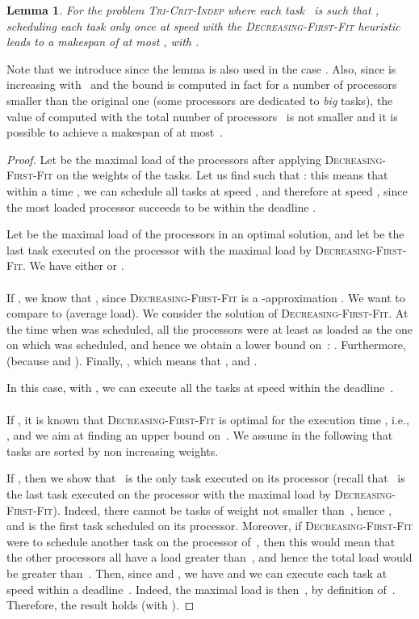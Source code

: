 \documentclass[a4paper]{article}
\theoremstyle{plain}
\newtheorem{lemma}{Lemma}
\theoremstyle{definition}
\theoremstyle{remark}
\newcommand{\dff}{\textsc{Dec\-reasing-First-Fit}\xspace}
\newcommand{\indep}{\textsc{Tri-Crit-In\-dep}\xspace}
\begin{document}
\begin{lemma}
\label{lemma.bigload}
For the problem \indep where each task~ is such that
 ,  scheduling each task only once at speed  with
 the \dff heuristic leads to a make\-span of at most , with
 .
\end{lemma}

Note that we introduce  since the lemma is
also used in the case . Also, since  is
increasing with~ and the bound is computed in fact for a number of
processors smaller than the original one (some processors are
dedicated to {\em big} tasks), the value of  computed with the
total number of processors~ is not smaller and it is possible to
achieve a makespan of at most~. 

\begin{proof}
Let  be the maximal load of the processors after
applying \dff on the weights of the tasks.  Let us find  such
that : this means that within
a time , we can schedule all tasks at speed , and therefore at speed , since the most loaded processor succeeds to be within
the deadline .

Let  be the maximal load of the processors in an
optimal solution, and let  be the last task executed on the
processor with the maximal load  by \dff. We have
either  or . 


\paragraph{} If , we know that
, since \dff is a -approxi\-mation
\cite{Graham69}. 
We want to compare  to  (average load).  We
consider the solution of \dff. At the time when  was scheduled,
all the processors were at least as loaded as the one on which 
was scheduled, and hence we obtain a lower bound on~: .  Furthermore,
 (because
 and ).
Finally, , which
means that , and
.

In this case, with , we can execute all the
tasks at speed
 within the deadline~.


\paragraph{} 
If , it is known that \dff is optimal for the execution time
\cite{Graham69}, i.e., , and we aim
at finding an upper bound on~.  We assume in the
following that tasks are sorted by non increasing weights.

If , then we show that ~is the only task executed on its processor (recall that ~is
the last task executed on the processor with the maximal load by
\dff). Indeed,
there cannot be  tasks of weight not smaller than~,
hence , and  is the first task scheduled on its
processor. Moreover, 
if \dff were to schedule another task on the processor of~,
  then this would mean that the  other processors all have a load
  greater than~, and hence the total load would be 
  greater than~. 
Then, since  and ,
we have  and we can execute each task at speed  within a deadline~. Indeed, the maximal
load is then~, by definition of~. Therefore, the result
holds (with ).


\end{proof}
\end{document}
